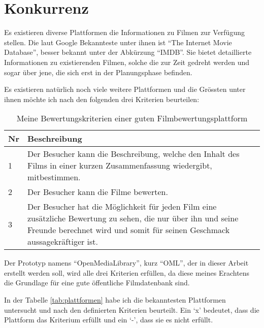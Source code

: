 \section{Konkurrenz}
Es existieren diverse Plattformen die Informationen zu Filmen zur Verfügung stellen.
Die laut Google \cite{movie_informations} Bekannteste unter ihnen ist ``The Internet Movie Database'',
besser bekannt unter der Abkürzung ``IMDB''. Sie bietet detaillierte Informationen
zu existierenden Filmen, solche die zur Zeit gedreht werden und sogar über jene, die
sich erst in der Planungsphase befinden.

Es existieren natürlich noch viele weitere Plattformen und die Grössten unter 
ihnen möchte ich nach den folgenden drei Kriterien beurteilen:

\begin{table}[h]
\begin{center}
    \begin{tabular}{lp{12cm}l}
        \toprule Nr & Beschreibung \\
        \midrule 1 & Der Besucher kann die Beschreibung, welche den Inhalt 
                     des Films in einer kurzen Zusammenfassung wiedergibt, mitbestimmen. \\
        \midrule 2 & Der Besucher kann die Filme bewerten. \\
        \midrule 3 & Der Besucher hat die Möglichkeit für jeden Film eine zusätzliche
                     Bewertung zu sehen, die nur über ihn und seine Freunde berechnet
                     wird und somit für seinen Geschmack aussagekräftiger ist. \\
        \bottomrule
    \end{tabular}
    \caption{Meine Bewertungskriterien einer guten Filmbewertungsplattform}
    \label{tab:bewertungskriterien}
\end{center}
\end{table}

Der Prototyp namens ``OpenMediaLibrary'', kurz ``OML'', der in dieser Arbeit erstellt werden soll, 
wird alle drei Kriterien erfüllen, da diese meines Erachtens die Grundlage für eine gute 
öffentliche Filmdatenbank sind.

In der Tabelle \ref{tab:plattformen} habe ich die bekanntesten 
Plattformen untersucht und nach den definierten Kriterien beurteilt. Ein `x' bedeutet,
dass die Plattform das Kriterium erfüllt und ein `-', dass sie es nicht erfüllt.

